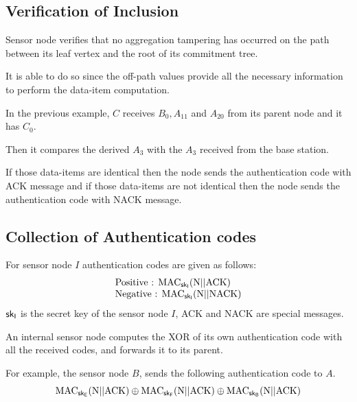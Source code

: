 \documentclass[%
  slidesonly,%
  semlayer%
  ]{seminar}                                  %
\newcommand{\sk}{\sf{sk}}
\begin{document}
\begin{slide}
      \subsection*{Verification of Inclusion}
        \vfill
        Sensor node verifies that no aggregation tampering has occurred on the path between its leaf vertex and the root of its commitment tree.

        It is able to do so since the off-path values provide all the necessary information to perform the data-item computation.

        In the previous example, $C$ receives $B_{0}, A_{11}$ and $ A_{20}$ from its parent node and it has $C_{0}$.
 
        Then it compares the derived $A_{3}$ with the $A_{3}$ received from the base station.

        If those data-items are identical then the node sends the authentication code with ACK message and if those data-items are not identical then the node sends the authentication code with NACK message.
        \vfill
        \clearpage

      \subsection*{Collection of Authentication codes}
        \vfill
        For sensor node $I$ authentication codes are given as follows:
        \begin{equation}
          \begin{array}{l}
            \mbox{Positive : } \mbox{MAC}_{\sk_{I}}(\mbox{N} || \mbox{ACK})\\
            \mbox{Negative : } \mbox{MAC}_{\sk_{I}}(\mbox{N} || \mbox{NACK})
          \end{array}
        \end{equation}        
        $\sk_{I}$ is the secret key of the sensor node $I$, ACK and NACK are special messages.

        An internal sensor node computes the XOR of its own authentication code with all the received codes, and forwards it to its parent.
 
        For example, the sensor node $B$, sends the following authentication code to $A$.
        \begin{equation*}
          \mbox{MAC}_{\sk_{E}}(\mbox{N}||\mbox{ACK}) \oplus \mbox{MAC}_{\sk_{F}}(\mbox{N}||\mbox{ACK}) \oplus \mbox{MAC}_{\sk_{B}}(\mbox{N}||\mbox{ACK})
        \end{equation*}
        \vfill
        \clearpage


\end{slide}
\end{document}
